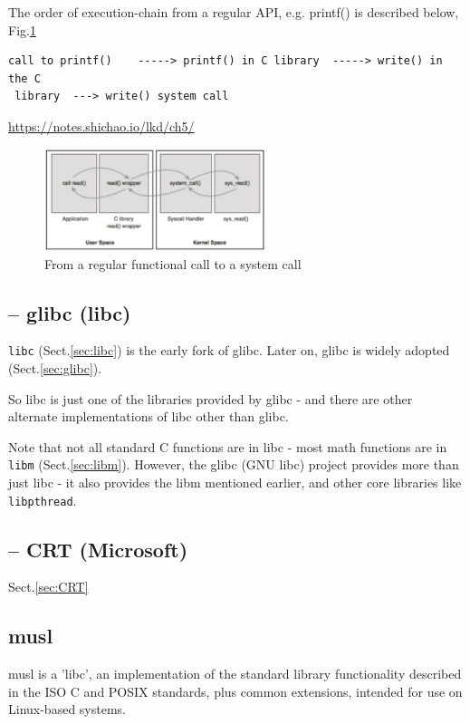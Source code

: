 The order of execution-chain from a regular API, e.g. printf() is described
below, Fig.\ref{fig:API-call-chain}
{\tiny
\begin{verbatim}
call to printf()    -----> printf() in C library  -----> write() in the C
 library  ---> write() system call 
\end{verbatim}
}
\url{https://notes.shichao.io/lkd/ch5/}


\begin{figure}[hbt]
  \centerline{\includegraphics[height=3cm,
    angle=0]{./images/API-call-chain.eps}}
\caption{From a regular functional call to a system call}
\label{fig:API-call-chain}
\end{figure}


\subsection{-- glibc (libc)}

\verb!libc! (Sect.\ref{sec:libc}) is the early fork of glibc.
Later on, glibc is widely adopted (Sect.\ref{sec:glibc}).

So libc is just one of the libraries provided by glibc - and there are other
alternate implementations of libc other than glibc.

Note that not all standard C functions are in libc - most math functions are in
\verb!libm! (Sect.\ref{sec:libm}).
However, the glibc (GNU libc) project provides more than just libc - it also
provides the libm mentioned earlier, and other core libraries like
\verb!libpthread!.

\subsection{-- CRT (Microsoft)}

Sect.\ref{sec:CRT}

\subsection{musl}
\label{sec:musl}

musl is a 'libc', an implementation of the standard library functionality
described in the ISO C and POSIX standards, plus common extensions, intended for
use on Linux-based systems.

